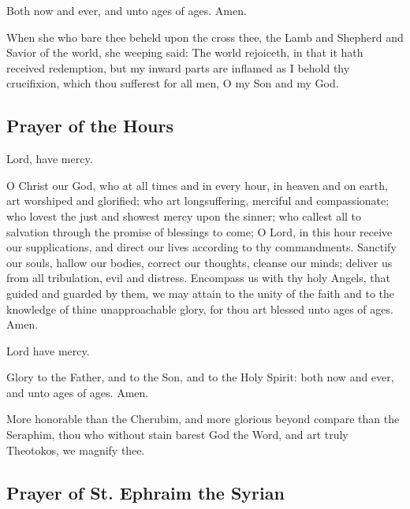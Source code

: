 Both now and ever, and unto ages of ages. Amen.

When she who bare thee beheld upon the cross thee, the Lamb and Shepherd and Savior of the world, she weeping said: The world rejoiceth, in that it hath received redemption, but my inward parts are inflamed as I behold thy crucifixion, which thou sufferest for all men, O my Son and my God.


\subsection{Prayer of the Hours}

Lord, have mercy. 

O Christ our God, who at all times and in every hour, in heaven and on earth, art worshiped and glorified; who art longsuffering, merciful and compassionate; who lovest the just and showest mercy upon the sinner; who callest all to salvation through the promise of blessings to come; O Lord, in this hour receive our supplications, and direct our lives according to thy commandments. Sanctify our souls, hallow our bodies, correct our thoughts, cleanse our minds; deliver us from all tribulation, evil and distress. Encompass us with thy holy Angels, that guided and guarded by them, we may attain to the unity of the faith and to the knowledge of thine unapproachable glory, for thou art blessed unto ages of ages. Amen.

Lord have mercy. 

Glory to the Father, and to the Son, and to the Holy Spirit: both now and ever, and unto ages of ages. Amen.

More honorable than the Cherubim, and more glorious beyond compare than the Seraphim, thou who without stain barest God the Word, and art truly Theotokos, we magnify thee.

\subsection{Prayer of St. Ephraim the Syrian}




